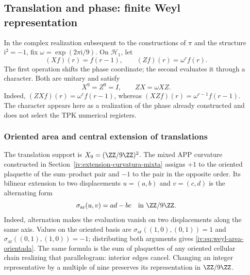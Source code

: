 

\subsection{Translation and phase: finite Weyl representation}

In the complex realization subsequent to the constructions of
\(\pi\) and the structure \(\mathrm i^2=-1\), fix
\(\omega=\exp(2\pi\mathrm i/9)\). On \(\mathcal H_1\), let
\begin{equation}
 (Xf)(r)=f(r-1),\qquad (Zf)(r)=\omega^r f(r).
 \label{iv:eq:weyl-operadores}
\end{equation}
The first operation shifts the phase coordinate; the second
evaluates it through a character. Both are unitary and satisfy
\begin{equation}
 X^9=Z^9=I,\qquad ZX=\omega XZ.
 \label{iv:eq:weyl-relacion}
\end{equation}
Indeed, \((ZXf)(r)=\omega^r f(r-1)\), whereas
\((XZf)(r)=\omega^{r-1}f(r-1)\). The character appears here as a
realization of the phase already constructed and does not select the TPK
numerical registers.

\subsubsection{Oriented area and central extension of translations}
\label{iv:weyl-area-extension}

The translation support is \(X_9=(\ZZ/9\ZZ)^2\).
The mixed APP curvature constructed in
Section~\ref{iv:extension-curvatura-mixta} assigns \(+1\) to the
oriented plaquette of the sum--product pair and \(-1\) to the
pair in the opposite order. Its bilinear extension to two displacements
\(u=(a,b)\) and \(v=(c,d)\) is the alternating form
\begin{equation}
 \sigma_{\mathrm{ar}}(u,v)=ad-bc\quad\text{in }\ZZ/9\ZZ.
 \label{iv:eq:weyl-area-orientada}
\end{equation}
Indeed, alternation makes the evaluation vanish on two displacements
along the same axis. Values on the oriented basis are
\(\sigma_{\mathrm{ar}}((1,0),(0,1))=1\) and
\(\sigma_{\mathrm{ar}}((0,1),(1,0))=-1\); distributing both
arguments gives \eqref{iv:eq:weyl-area-orientada}. The same formula is
the sum of plaquettes of any oriented cellular chain realizing
that parallelogram: interior edges cancel. Changing an
integer representative by a multiple of nine preserves its representation
in \(\ZZ/9\ZZ\).

